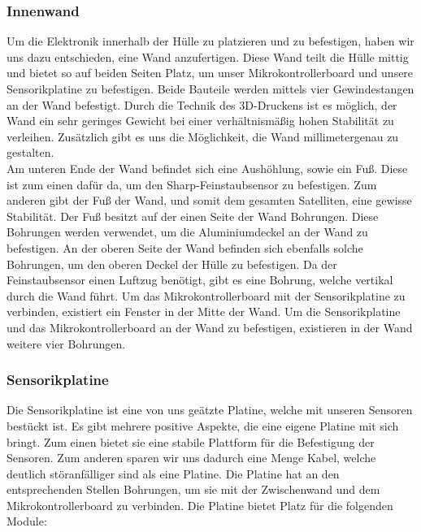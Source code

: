 \subsubsection{Innenwand}
Um die Elektronik innerhalb der Hülle zu platzieren und zu befestigen, haben wir uns dazu entschieden, eine Wand anzufertigen. Diese Wand teilt die Hülle mittig und bietet so auf beiden Seiten Platz, um unser Mikrokontrollerboard und unsere Sensorikplatine zu befestigen. Beide Bauteile werden mittels vier Gewindestangen an der Wand befestigt. Durch die Technik des 3D-Druckens ist es möglich, der Wand ein sehr geringes Gewicht bei einer verhältnismäßig hohen Stabilität zu verleihen. Zusätzlich gibt es uns die Möglichkeit, die Wand millimetergenau zu gestalten. \\
Am unteren Ende der Wand befindet sich eine Aushöhlung, sowie ein Fuß. Diese ist zum einen dafür da, um den Sharp-Feinstaubsensor zu befestigen. Zum anderen gibt der Fuß der Wand, und somit dem gesamten Satelliten, eine gewisse Stabilität. Der Fuß besitzt auf der einen Seite der Wand Bohrungen. Diese Bohrungen werden verwendet, um die Aluminiumdeckel an der Wand zu befestigen. An der oberen Seite der Wand befinden sich ebenfalls solche Bohrungen, um den oberen Deckel der Hülle zu befestigen. Da der Feinstaubsensor einen Luftzug benötigt, gibt es eine Bohrung, welche vertikal durch die Wand führt. Um das Mikrokontrollerboard mit der Sensorikplatine zu verbinden, existiert ein Fenster in der Mitte der Wand. Um die Sensorikplatine und das Mikrokontrollerboard an der Wand zu befestigen, existieren in der Wand weitere vier Bohrungen.

\subsubsection{Sensorikplatine}
Die Sensorikplatine ist eine von uns geätzte Platine, welche mit unseren Sensoren bestückt ist. Es gibt mehrere positive Aspekte, die eine eigene Platine mit sich bringt. Zum einen bietet sie eine stabile Plattform für die Befestigung der Sensoren. Zum anderen sparen wir uns dadurch eine Menge Kabel, welche deutlich störanfälliger sind als eine Platine. Die Platine hat an den entsprechenden Stellen Bohrungen, um sie mit der Zwischenwand und dem Mikrokontrollerboard zu verbinden. Die Platine bietet Platz für die folgenden Module:

